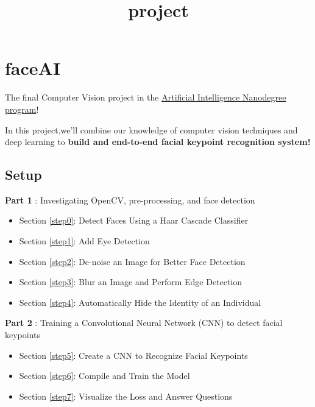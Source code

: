 \documentclass[11pt]{article}
\title{project}
\providecommand{\tightlist}{%
      \setlength{\itemsep}{0pt}\setlength{\parskip}{0pt}}
\begin{document}
    
    
    \maketitle
    
    

    
    \section{faceAI}\label{faceai}

    The final Computer Vision project in the
\href{https://www.udacity.com/course/artificial-intelligence-nanodegree--nd889}{Artificial
Intelligence Nanodegree program}!

In this project,we'll combine our knowledge of computer vision
techniques and deep learning to \textbf{build and end-to-end facial
keypoint recognition system!}

\subsection{Setup}\label{setup}

\textbf{Part 1} : Investigating OpenCV, pre-processing, and face
detection

\begin{itemize}
\tightlist
\item
  Section \ref{step0}: Detect Faces Using a Haar Cascade Classifier
\item
  Section \ref{step1}: Add Eye Detection
\item
  Section \ref{step2}: De-noise an Image for Better Face Detection
\item
  Section \ref{step3}: Blur an Image and Perform Edge Detection
\item
  Section \ref{step4}: Automatically Hide the Identity of an Individual
\end{itemize}

\textbf{Part 2} : Training a Convolutional Neural Network (CNN) to
detect facial keypoints

\begin{itemize}
\tightlist
\item
  Section \ref{step5}: Create a CNN to Recognize Facial Keypoints
\item
  Section \ref{step6}: Compile and Train the Model
\item
  Section \ref{step7}: Visualize the Loss and Answer Questions
\end{itemize}
\end{document}
